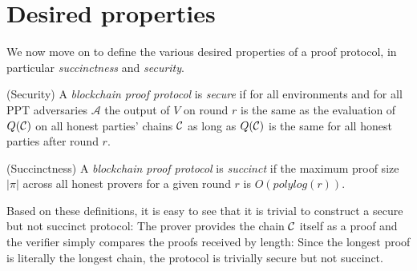 \section{Desired properties}

We now move on to define the various desired properties of a proof protocol, in
particular \textit{succinctness} and \textit{security}.

\begin{definition}{(Security)}
A \textit{blockchain proof protocol} is \textit{secure} if for all environments
and for all PPT adversaries $\mathcal{A}$ the output of $V$ on round $r$ is the
same as the evaluation of $Q(\mathcal{C})$ on all honest parties' chains $\mathcal{C}$ as
long as $Q(\mathcal{C})$ is the same for all honest parties after round $r$.
\end{definition}

\begin{definition}{(Succinctness)}
A \textit{blockchain proof protocol} is \textit{succinct} if the maximum proof
size $|\pi|$ across all honest provers for a given round $r$ is
$O(polylog(r))$.
\end{definition}

Based on these definitions, it is easy to see that it is trivial to construct a
secure but not succinct protocol: The prover provides the chain $\mathcal{C}$ itself
as a proof and the verifier simply compares the proofs received by length:
Since the longest proof is literally the longest chain, the protocol is
trivially secure but not succinct.


